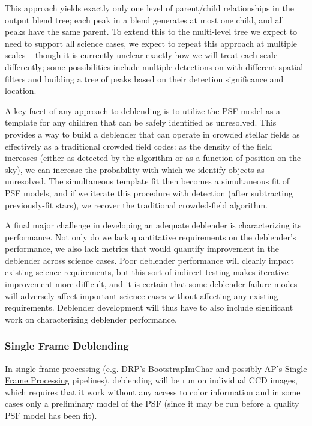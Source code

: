 This approach yields exactly only one level of parent/child relationships in the output blend tree; each peak in a blend generates at most one child, and all peaks have the same parent.  To extend this to the multi-level tree we expect to need to support all science cases, we expect to repeat this approach at multiple scales -- though it is currently unclear exactly how we will treat each scale differently; some possibilities include multiple detections on with different spatial filters and building a tree of peaks based on their detection significance and location.

A key facet of any approach to deblending is to utilize the PSF model as a template for any children that can be safely identified as unresolved.  This provides a way to build a deblender that can operate in crowded stellar fields as effectively as a traditional crowded field codes: as the density of the field increases (either as detected by the algorithm or as a function of position on the sky), we can increase the probability with which we identify objects as unresolved.  The simultaneous template fit then becomes a simultaneous fit of PSF models, and if we iterate this procedure with detection (after subtracting previously-fit stars), we recover the traditional crowded-field algorithm.

A final major challenge in developing an adequate deblender is characterizing its performance.  Not only do we lack quantitative requirements on the deblender's performance, we also lack metrics that would quantify improvement in the deblender across science cases.  Poor deblender performance will clearly impact existing science requirements, but this sort of indirect testing makes iterative improvement more difficult, and it is certain that some deblender failure modes will adversely affect important science cases without affecting any existing requirements.  Deblender development will thus have to also include significant work on characterizing deblender performance.


\subsubsection{Single Frame Deblending}
\label{sec:acSingleFrameDeblending}

In single-frame processing (e.g. \hyperref[sec:drpBootstrapImChar]{DRP's BootstrapImChar} and possibly AP's \hyperref[sec:apSingleFrameProcessing]{Single Frame Processing} pipelines), deblending will be run on individual CCD images, which requires that it work without any access to color information and in some cases only a preliminary model of the PSF (since it may be run before a quality PSF model has been fit).

